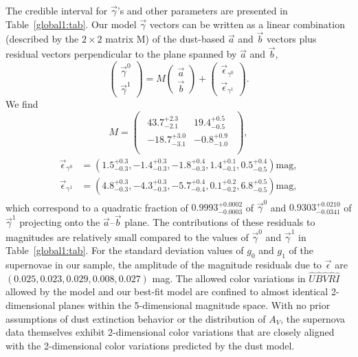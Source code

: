 \documentclass[trackchanges]{aastex62}   	%
\begin{document}
The credible interval for $\vec{\gamma}$'s and other parameters are presented in Table~\ref{global1:tab}.
Our model $\vec{\gamma}$ vectors can be written as a linear combination (described by the $2 \times 2$ matrix M) of the
dust-based $\vec{a}$ and $\vec{b}$ vectors plus residual vectors perpendicular to the plane spanned by $\vec{a}$ and $\vec{b}$,
\begin{equation}
\begin{pmatrix}
\vec{\gamma}^0 \\
\vec{\gamma}^1
\end{pmatrix}=
M
\begin{pmatrix}
\vec{a} \\
\vec{b}
\end{pmatrix}+
\begin{pmatrix}
\vec{\epsilon}_{\gamma^0} \\
\vec{\epsilon}_{\gamma^1}
\end{pmatrix}.
\label{trans_I:eqn}
\end{equation}
We find
\begin{equation}
M=
\begin{pmatrix}
\begin{array}{rr}
43.7^{+2.3}_{-2.1} & 19.4^{+0.5}_{-0.5} \\
-18.7^{+3.0}_{-3.1} & -0.8^{+0.9}_{-1.0} \\
\end{array}
\end{pmatrix} ,
\end{equation}
\begin{align}
\begin{split}
\vec{\epsilon}_{\gamma^0} &=\left(1.5^{+0.3}_{-0.3} , -1.4^{+0.3}_{-0.3} , -1.8^{+0.4}_{-0.3} , 1.4^{+0.1}_{-0.1} , 0.5^{+0.4}_{-0.5} \right) \text{mag}, \\
\vec{\epsilon}_{\gamma^1} & =\left(4.8^{+0.3}_{-0.3} , -4.3^{+0.3}_{-0.3} , -5.7^{+0.4}_{-0.4} , 0.1^{+0.2}_{-0.2} , 6.8^{+0.5}_{-0.5}\right) \text{mag},
\end{split}
\label{res_1:eqn}
\end{align}
which correspond to
a quadratic fraction of $0.9993^{+0.0002}_{-0.0003}$ of $\vec{\gamma}^0$ and
$0.9303^{+0.0210}_{-0.0341}$ of $\vec{\gamma}^1$ projecting onto the $\vec{a}$--$\vec{b}$ plane.
The  contributions of these residuals to magnitudes are relatively small compared to
the values of $\vec{\gamma}^0$ and $\vec{\gamma}^1$ in Table~\ref{global1:tab}.
For the standard deviation values of $g_0$ and $g_1$ of the supernovae in our sample, the amplitude of the magnitude residuals due to $\vec{\epsilon}$ are 
$\left(0.025, 0.023,0.029, 0.008, 0.027\right)$ mag.
The allowed color
variations in ${\hat{U}}{\hat{B}}{\hat{V}}{\hat{R}}{\hat{I}}$ allowed by the  model and our best-fit model are confined to almost identical
2-dimensional
planes within
the 5-dimensional magnitude space.
With no prior assumptions of dust extinction behavior or the distribution of $A_V$, the supernova data themselves exhibit
2-dimensional color variations that are closely aligned with the 2-dimensional color variations predicted by the  dust model.
\end{document}
